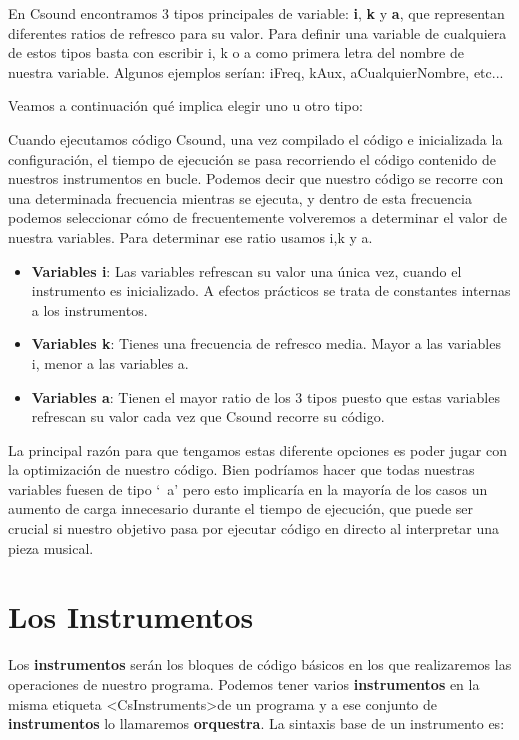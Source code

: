 En Csound encontramos 3 tipos principales de variable: \textbf{i}, \textbf{k} y \textbf{a}, que representan diferentes ratios de refresco para su valor. Para definir una variable de cualquiera de estos tipos basta con escribir i, k o a como primera letra del nombre de nuestra variable. Algunos ejemplos serían: iFreq, kAux, aCualquierNombre, etc...

Veamos a continuación qué implica elegir uno u otro tipo:

Cuando ejecutamos código Csound, una vez compilado el código e inicializada la configuración, el tiempo de ejecución se pasa recorriendo el código contenido de nuestros instrumentos en bucle. Podemos decir que nuestro código se recorre con una determinada frecuencia mientras se ejecuta, y dentro de esta frecuencia podemos seleccionar cómo de frecuentemente volveremos a determinar el valor de nuestra variables. Para determinar ese ratio usamos i,k y a.

\begin{itemize}
 \item \textbf{Variables i}: Las variables refrescan su valor una única vez, cuando el instrumento es inicializado. A efectos prácticos se trata de constantes internas a los instrumentos.
 
 \item \textbf{Variables k}: Tienes una frecuencia de refresco media. Mayor a las variables i, menor a las variables a.
 
 \item \textbf{Variables a}: Tienen el mayor ratio de los 3 tipos puesto que estas variables refrescan su valor cada vez que Csound recorre su código.

\end{itemize}

La principal razón para que tengamos estas diferente opciones es poder jugar con la optimización de nuestro código. Bien podríamos hacer que todas nuestras variables fuesen de tipo `\ a' pero esto implicaría en la mayoría de los casos un aumento de carga innecesario durante el tiempo de ejecución, que puede ser crucial si nuestro objetivo pasa por ejecutar código en directo al interpretar una pieza musical.

\section{Los Instrumentos}\label{sec:Instrumentos}
Los \textbf{instrumentos} serán los bloques de código básicos en los que realizaremos las operaciones de nuestro programa. Podemos tener varios \textbf{instrumentos} en la misma etiqueta \textless CsInstruments\textgreater de un programa y a ese conjunto de \textbf{instrumentos} lo llamaremos \textbf{orquestra}.
La sintaxis base de un instrumento es:

